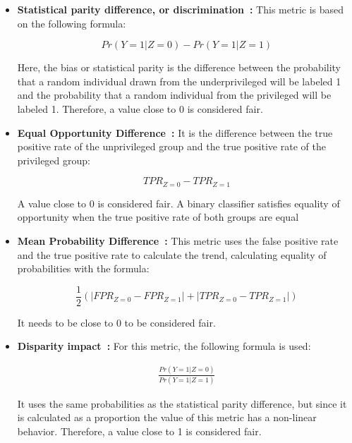 \documentclass[runningheads]{llncs}
\begin{document}
\begin{itemize}
\item \textbf{Statistical parity difference, or discrimination~\citep{Zemel_2013}:} This metric is based on the following formula:

\begin{equation}
Pr(Y=1|Z=0)-Pr(Y=1|Z=1)
\end{equation}
 
Here, the bias or statistical parity is the difference between the probability that a random individual drawn from the underprivileged will be labeled 1 and the probability that a random individual from the privileged will be labeled 1. Therefore, a value close to 0 is considered fair.

\item \textbf{Equal Opportunity Difference~\citep{Biswas_2020}:} It is the difference between the true positive rate of the unprivileged group and the true positive rate of the privileged group:

\begin{equation}
TPR_{Z=0} - TPR_{Z=1}
\end{equation}
 
A value close to 0 is considered fair. A binary classifier satisfies equality of opportunity when the true positive rate of both groups are equal~\citep{Hardt_2016}

\item \textbf{Mean Probability Difference~\citep{Biswas_2020}:} This metric uses the false positive rate and the true positive rate to calculate the trend, calculating equality of probabilities with the formula:

\begin{equation}
\frac{1}{2}(|FPR_{Z=0} - FPR_{Z=1}|+|TPR_{Z=0} - TPR_{Z=1}|)
\end{equation}
 
It needs to be close to 0 to be considered fair.

\item \textbf{Disparity impact~\citep{Biswas_2020}:} For this metric, the following formula is used:

\begin{align*}
\frac{Pr(Y=1|Z=0)}{Pr(Y=1|Z=1)}
\end{align*}

It uses the same probabilities as the statistical parity difference, but since it is calculated as a proportion the value of this metric has a non-linear behavior. Therefore, a value close to 1 is considered fair.


\end{itemize}
\end{document}
